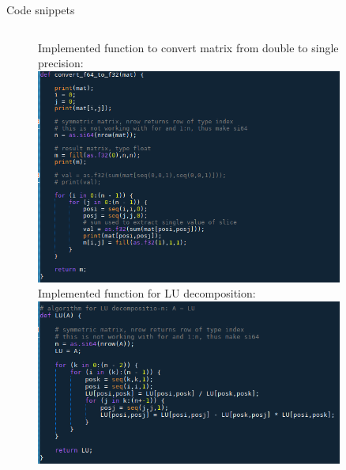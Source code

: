 \documentclass[aspectratio=169]{beamer}
\begin{document}
\begin{frame}[c]{Code snippets}
    \begin{figure}
        \begin{columns}[onlytextwidth,t]
            Implemented function to convert matrix from double to single precision: \\
            \includegraphics[width=0.9\textwidth]{images/HPL_AI_convertTof32.png}
            Implemented function for LU decomposition: \\
            \includegraphics[width=0.9\textwidth]{images/HPL_AI_LU.png}
        \end{columns}        
    \end{figure}          
\end{frame}
\end{document}
